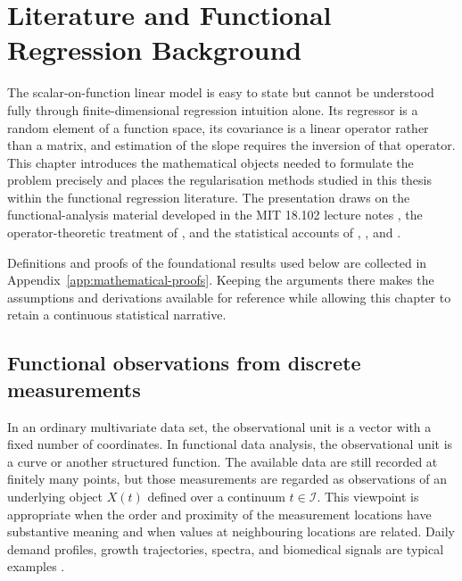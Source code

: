 \chapter{Literature and Functional Regression Background}
\label{chap:background}

The scalar-on-function linear model is easy to state but cannot be understood fully through finite-dimensional regression intuition alone. Its regressor is a random element of a function space, its covariance is a linear operator rather than a matrix, and estimation of the slope requires the inversion of that operator. This chapter introduces the mathematical objects needed to formulate the problem precisely and places the regularisation methods studied in this thesis within the functional regression literature. The presentation draws on the functional-analysis material developed in the MIT 18.102 lecture notes \parencite{lin_mit_18102_2021}, the operator-theoretic treatment of \textcite{hsing_eubank_2015}, and the statistical accounts of \textcite{ramsay_silverman_2005}, \textcite{horvath_kokoszka_2012}, and \textcite{kokoszka_reimherr_2017}.

Definitions and proofs of the foundational results used below are collected
in Appendix~\ref{app:mathematical-proofs}.  Keeping the arguments there makes
the assumptions and derivations available for reference while allowing this
chapter to retain a continuous statistical narrative.

\section{Functional observations from discrete measurements}
\label{sec:functional-observations}

In an ordinary multivariate data set, the observational unit is a vector with a fixed number of coordinates. In functional data analysis, the observational unit is a curve or another structured function. The available data are still recorded at finitely many points, but those measurements are regarded as observations of an underlying object $X(t)$ defined over a continuum $t\in\mathcal I$. This viewpoint is appropriate when the order and proximity of the measurement locations have substantive meaning and when values at neighbouring locations are related. Daily demand profiles, growth trajectories, spectra, and biomedical signals are typical examples \parencite{ramsay_silverman_2005,kokoszka_reimherr_2017}.

